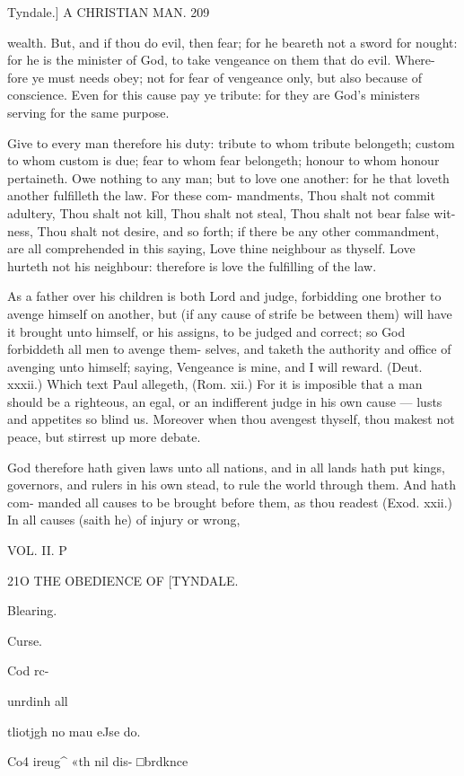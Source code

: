 \documentclass{custom}
\begin{document}
Tyndale.] A CHRISTIAN MAN. 209 

wealth. But, and if thou do evil, then fear; for he 
beareth not a sword for nought: for he is the minister 
of God, to take vengeance on them that do evil. Where- 
fore ye must needs obey; not for fear of vengeance only, 
but also because of conscience. Even for this cause pay 
ye tribute: for they are God's ministers serving for the 
same purpose. 

Give to every man therefore his duty: tribute to whom 
tribute belongeth; custom to whom custom is due; fear 
to whom fear belongeth; honour to whom honour pertaineth. 
Owe nothing to any man; but to love one another: for 
he that loveth another fulfilleth the law. For these com- 
mandments, Thou shalt not commit adultery, Thou shalt 
not kill, Thou shalt not steal, Thou shalt not bear false wit- 
ness, Thou shalt not desire, and so forth; if there be any other 
commandment, are all comprehended in this saying, Love 
thine neighbour as thyself. Love hurteth not his neighbour:
therefore is love the fulfilling of the law. 

As a father over his children is both Lord and judge, 
forbidding one brother to avenge himself on another, but
(if any cause of strife be between them) will have it 
brought unto himself, or his assigns, to be judged and 
correct; so God forbiddeth all men to avenge them- 
selves, and taketh the authority and office of avenging unto 
himself; saying, Vengeance is mine, and I will reward. 
(Deut. xxxii.) Which text Paul allegeth, (Rom. xii.) 
For it is imposible that a man should be a righteous, an 
egal, or an indifferent judge in his own cause — lusts and 
appetites so blind us. Moreover when thou avengest 
thyself, thou makest not peace, but stirrest up more 
debate. 

God therefore hath given laws unto all nations, and in 
all lands hath put kings, governors, and rulers in his own 
stead, to rule the world through them. And hath com- 
manded all causes to be brought before them, as thou readest 
(Exod. xxii.) In all causes (saith he) of injury or wrong, 

VOL. II. P 

21O
THE OBEDIENCE OF 
[TYNDALE.

Blearing. 

Curse. 

Cod rc- 

unrdinh all 

tliotjgh no 
mau eJse 
do. 

Co4 ireug^ 
«th nil dis- 
□brdknce 
\end{document}

